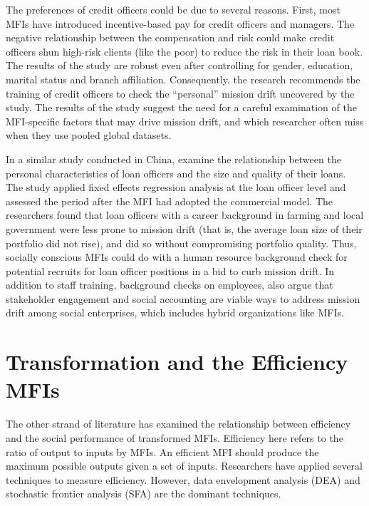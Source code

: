 \documentclass[a4paper,nobind]{templates/ociamthesis}
\begin{document}
The preferences of credit officers could be due to several reasons. First, most MFIs have introduced incentive-based pay for credit officers and managers. The negative relationship between the compensation and risk could make credit officers shun high-risk clients (like the poor) to reduce the risk in their loan book. The results of the study are robust even after controlling for gender, education, marital status and branch affiliation. Consequently, the research recommends the training of credit officers to check the ``personal'' mission drift uncovered by the study. The results of the study suggest the need for a careful examination of the MFI-specific factors that may drive mission drift, and which researcher often miss when they use pooled global datasets.

In a similar study conducted in China, \textcite{jia2016commercialization} examine the relationship between the personal characteristics of loan officers and the size and quality of their loans. The study applied fixed effects regression analysis at the loan officer level and assessed the period after the MFI had adopted the commercial model. The researchers found that loan officers with a career background in farming and local government were less prone to mission drift (that is, the average loan size of their portfolio did not rise), and did so without compromising portfolio quality. Thus, socially conscious MFIs could do with a human resource background check for potential recruits for loan officer positions in a bid to curb mission drift. In addition to staff training, background checks on employees, \textcite{ramus2017stakeholders} also argue that stakeholder engagement and social accounting are viable ways to address mission drift among social enterprises, which includes hybrid organizations like MFIs.

\hypertarget{transformation-and-the-efficiency-mfis}{%
\section{Transformation and the Efficiency MFIs}\label{transformation-and-the-efficiency-mfis}}

\noindent The other strand of literature has examined the relationship between efficiency and the social performance of transformed MFIs. Efficiency here refers to the ratio of output to inputs by MFIs. An efficient MFI should produce the maximum possible outputs given a set of inputs. Researchers have applied several techniques to measure efficiency. However, data envelopment analysis (DEA) and stochastic frontier analysis (SFA) are the dominant techniques.
\end{document}
